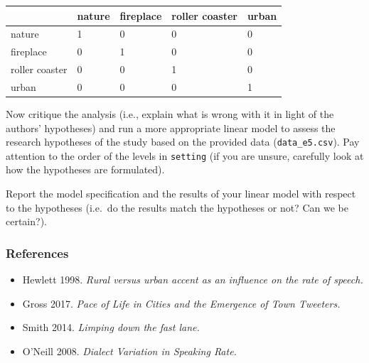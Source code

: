 \documentclass[
]{article}
\providecommand{\tightlist}{%
  \setlength{\itemsep}{0pt}\setlength{\parskip}{0pt}}
\begin{document}
\begin{longtable}[]{@{}lllll@{}}
\toprule\noalign{}
& nature & fireplace & roller coaster & urban \\
\midrule\noalign{}
\endhead
\bottomrule\noalign{}
\endlastfoot
nature & 1 & 0 & 0 & 0 \\
fireplace & 0 & 1 & 0 & 0 \\
roller coaster & 0 & 0 & 1 & 0 \\
urban & 0 & 0 & 0 & 1 \\
\end{longtable}

Now critique the analysis (i.e., explain what is wrong with it in light
of the authors' hypotheses) and run a more appropriate linear model to
assess the research hypotheses of the study based on the provided data
(\texttt{data\_e5.csv}). Pay attention to the order of the levels in
\texttt{setting} (if you are unsure, carefully look at how the
hypotheses are formulated).

Report the model specification and the results of your linear model with
respect to the hypotheses (i.e.~do the results match the hypotheses or
not? Can we be certain?).

\subsubsection{References}\label{references}

\begin{itemize}
\tightlist
\item
  Hewlett 1998. \emph{Rural versus urban accent as an influence on the
  rate of speech.}
\item
  Gross 2017. \emph{Pace of Life in Cities and the Emergence of Town
  Tweeters.}
\item
  Smith 2014. \emph{Limping down the fast lane.}
\item
  O'Neill 2008. \emph{Dialect Variation in Speaking Rate.}
\end{itemize}
\end{document}
